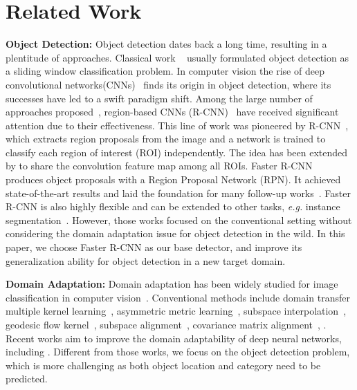 \documentclass[10pt,twocolumn,letterpaper]{article}
\begin{document}
\section{Related Work}
\label{sec:related}
\textbf{Object Detection:} Object detection dates back a long time, resulting in a plentitude of approaches. Classical work ~\cite{dalal2005histograms,felzenszwalb2010object,viola2001rapid} usually formulated object detection as a sliding window classification problem. In computer vision the rise of deep convolutional networks(CNNs)~\cite{krizhevsky2012imagenet} finds its origin in object detection, where its successes have led to a swift paradigm shift. Among the large number of approaches proposed~\cite{girshick2014rich,sermanet2013overfeat,girshick2015fast,gidaris2015object,liu2016ssd,li2016r}, region-based CNNs (R-CNN)~\cite{girshick2014rich,girshick2015fast,zhang2016Faster} have received significant attention due to their effectiveness. This line of work was pioneered by R-CNN~\cite{girshick2014rich}, which extracts region proposals from the image and a network is trained to classify each region of interest (ROI) independently. The idea has been extended by \cite{girshick2015fast,he2014spatial} to share the convolution feature map among all ROIs. Faster R-CNN~\cite{girshick2014rich} produces object proposals with a Region Proposal Network (RPN). It achieved state-of-the-art results and laid the foundation for many follow-up works~\cite{gidaris2015object,liu2016ssd,li2016r,lin2016feature,zhang2016Faster}. Faster R-CNN is also highly flexible and can be extended to other tasks, \textit{e.g.} instance segmentation~\cite{dai2016instance}. However, those works focused on the conventional setting without considering the domain adaptation issue for object detection in the wild. In this paper, we choose Faster R-CNN as our base detector,  and improve its generalization ability for object detection in a new target domain. 

\textbf{Domain Adaptation:} 
Domain adaptation has been widely studied for image classification in computer vision~\cite{DuanTPAMI2012a,DuanTPAMI2012b,kulis2011you,gopalan2011domain,gong2012geodesic,fernando2013unsupervised,sun2015return,long2015learning,ganin2015unsupervised,ghifary2016deep,sener2016learning,panareda2017open,motiian2017unified,li2017domain}. Conventional methods include domain transfer multiple kernel learning~\cite{DuanTPAMI2012a,DuanTPAMI2012b}, asymmetric metric learning~\cite{kulis2011you}, subspace interpolation~\cite{gopalan2011domain}, geodesic flow kernel~\cite{gong2012geodesic}, subspace alignment~\cite{fernando2013unsupervised}, covariance matrix alignment~\cite{sun2015return,wang2017deep}, \etc. Recent works aim to improve the domain adaptability of deep neural networks, including \cite{long2015learning,ganin2015unsupervised,ghifary2016deep,sener2016learning,panareda2017open,motiian2017unified,li2017deeper,haeusser2017associative,lu2017unsupervised,maria2017autodial}. Different from those works, we focus on the object detection problem, which is more challenging as both object location and category need to be predicted.  
\end{document}
